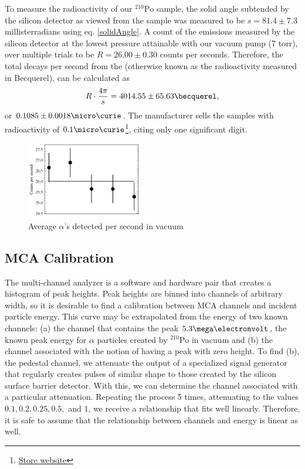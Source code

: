 \documentclass[12pt]{article}
\newcommand{\po}{{}^{210}\text{Po}}
\begin{document}
\begin{multicols}{2}
    To measure the radioactivity of our $\po$ sample, the solid angle subtended by the silicon detector as viewed from the sample was measured to be $s = 81.4\pm7.3$ millisterradians using eq. \ref{solidAngle}. A count of the emissions measured by the silicon detector at the lowest pressure attainable with our vacuum pump (7 torr), over multiple trials to be $R = 26.00 \pm 0.30$ counts per seconds. Therefore, the total decays per second from the (otherwise known as the radioactivity measured in Becquerel), can be calculated as
    \begin{equation}
        R\cdot\frac{4\pi}{s} = 4014.55 \pm 65.63 \becquerel,
    \end{equation}
    or $0.1085 \pm 0.0018 \micro\curie$. The manufacturer sells the samples with radioactivity of $0.1\micro\curie$\footnote{\href{https://www.pasco.com/products/lab-apparatus/atomic-and-nuclear/sn-9085}{Store website}}, citing only one significant digit.
    \begin{figure}[H]
        \includegraphics[width=0.45\textwidth]{charts/sample_bq.png}
        \caption{Average $\alpha$'s detected per second in vacuum}
    \end{figure}

    \subsection{MCA Calibration}
    The multi-channel analyzer is a software and hardware pair that creates a histogram of peak heights. Peak heights are binned into channels of arbitrary width, so it is desirable to find a calibration between MCA channels and incident particle energy. This curve may be extrapolated from the energy of two known channels: (a) the channel that contains the peak $5.3 \mega\electronvolt$, the known peak energy for $\alpha$ particles created by $\po$ in vacuum and (b) the channel associated with the notion of having a peak with zero height. To find (b), the pedestal channel, we attenuate the output of a specialized signal generator that regularly creates pulses of similar shape to those created by the silicon surface barrier detector. With this, we can determine the channel associated with a particular attenuation. Repeating the process 5 times, attenuating to the values $0.1, 0.2, 0.25, 0.5,$ and $1$, we receive a relationship that fits well linearly. Therefore, it is safe to assume that the relationship between channels and energy is linear as well.


\end{multicols}
\end{document}
